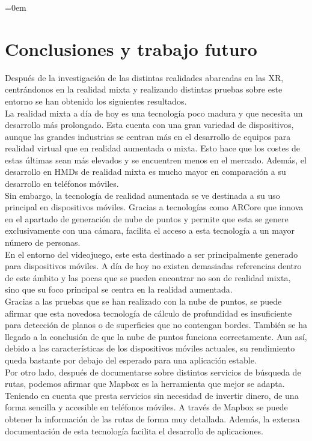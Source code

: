 \parindent=0em
\chapter{Conclusiones y trabajo futuro}
\noindent

Después de la investigación de las distintas realidades abarcadas en las XR, centrándonos en la realidad mixta y realizando distintas pruebas sobre este entorno se han obtenido los siguientes resultados. \\

La realidad mixta a día de hoy es una tecnología poco madura y que necesita un desarrollo más prolongado. Esta cuenta con una gran variedad de dispositivos, aunque las grandes industrias se centran más en el desarrollo de equipos para realidad virtual que en realidad aumentada o mixta. Esto hace que los costes de estas últimas sean más elevados y se encuentren menos en el mercado. Además, el desarrollo en HMDs de realidad mixta es mucho mayor en comparación a su desarrollo en teléfonos móviles.\\

Sin embargo, la tecnología de realidad aumentada se ve destinada a su uso principal en dispositivos móviles. Gracias a tecnologías como ARCore que innova en el apartado de generación de nube de puntos y permite que esta se genere exclusivamente con una cámara, facilita el acceso a esta tecnología a un mayor número de personas.\\

En el entorno del videojuego, este esta destinado a ser principalmente generado para dispositivos móviles. A día de hoy no existen demasiadas referencias dentro de este ámbito y las pocas que se pueden encontrar no son de realidad mixta, sino que su foco principal se centra en la realidad aumentada.\\

Gracias a las pruebas que se han realizado con la nube de puntos, se puede afirmar que esta novedosa tecnología de cálculo de profundidad es insuficiente para detección de planos o de superficies que no contengan bordes. También se ha llegado a la conclusión de que la nube de puntos funciona correctamente. Aun así, debido a las características de los dispositivos móviles actuales, su rendimiento queda bastante por debajo del esperado para una aplicación estable.\\

Por otro lado, después de documentarse sobre distintos servicios de búsqueda de rutas, podemos afirmar que Mapbox es la herramienta que mejor se adapta. Teniendo en cuenta que presta servicios sin necesidad de invertir dinero, de una forma sencilla y accesible en teléfonos móviles. A través de Mapbox se puede obtener la información de las rutas de forma muy detallada. Además, la extensa documentación de esta tecnología facilita el desarrollo de aplicaciones.\\

